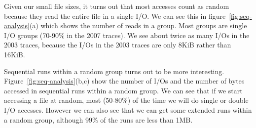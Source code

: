 Given our small file sizes, it turns out that most accesses count as
random because they read the entire file in a single I/O.  We can see
this in figure~\ref{fig:seq-analysis}(a) which shows the number of
reads in a group.  Most groups are single I/O groups (70-90\% in the
2007 traces).  We see about twice as many I/Os in the 2003 traces,
because the I/Os in the 2003 traces are only 8KiB rather than 16KiB.

Sequential runs within a random group turns out to be more
interesting.  Figure~\ref{fig:seq-analysis}(b,c) show the number of
I/Os and the number of bytes accessed in sequential runs within a
random group.  We can see that if we start accessing a file at random,
most (50-80\%) of the time we will do single or double I/O accesses.
However we can also see that we can get some extended runs within a
random group, although 99\% of the runs are less than 1MB.


